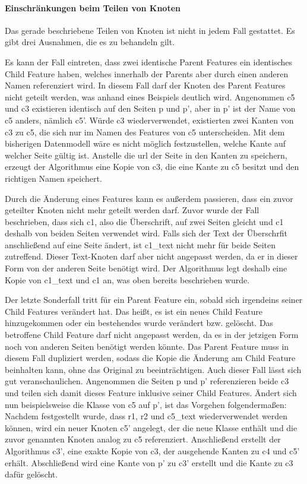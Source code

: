     \paragraph{Einschränkungen beim Teilen von Knoten}
    Das gerade beschriebene Teilen von Knoten ist nicht in jedem Fall gestattet.
    Es gibt drei Ausnahmen, die es zu behandeln gilt.

    Es kann der Fall eintreten, dass zwei identische Parent Features
    ein identisches Child Feature haben,
    welches innerhalb der Parents aber durch einen anderen Namen referenziert wird.
    In diesem Fall darf der Knoten des Parent Features nicht geteilt werden,
    was anhand eines Beispiels deutlich wird.
    Angenommen c5 und c3 existieren identisch auf den Seiten p und p',
    aber in p' ist der Name von c5 anders, nämlich c5'.
    Würde c3 wiederverwendet, existierten zwei Kanten von c3 zu c5,
    die sich nur im Namen des Features von c5 unterscheiden.
    Mit dem bisherigen Datenmodell wäre es nicht möglich festzustellen,
    welche Kante auf welcher Seite gültig ist.
    Anstelle die \gls{url} der Seite in den Kanten zu speichern,
    erzeugt der Algorithmus eine Kopie von c3,
    die eine Kante zu c5 besitzt und den richtigen Namen speichert.

    Durch die Änderung eines Features kann es außerdem passieren,
    dass ein zuvor geteilter Knoten nicht mehr geteilt werden darf.
    Zuvor wurde der Fall beschrieben, dass sich c1,
    also die Überschrift, auf zwei Seiten gleicht und c1 deshalb von beiden Seiten
    verwendet wird.
    Falls sich der Text der Überschrfit anschließend auf eine Seite ändert,
    ist c1\_text nicht mehr für beide Seiten zutreffend.
    Dieser Text-Knoten darf aber nicht angepasst werden,
    da er in dieser Form von der anderen Seite benötigt wird.
    Der Algorithmus legt deshalb eine Kopie von c1\_text und c1 an,
    was oben bereits beschrieben wurde.

    Der letzte Sonderfall tritt für ein Parent Feature ein,
    sobald sich irgendeins seiner Child Features verändert hat.
    Das heißt, es ist ein neues Child Feature hinzugekommen oder
    ein bestehendes wurde verändert bzw. gelöscht.
    Das betroffene Child Feature darf nicht angepasst werden,
    da es in der jetzigen Form noch von anderen Seiten benötigt werden könnte.
    Das Parent Feature muss in diesem Fall dupliziert werden,
    sodass die Kopie die Änderung am Child Feature beinhalten kann,
    ohne das Original zu beeinträchtigen.
    Auch dieser Fall lässt sich gut veranschaulichen.
    Angenommen die Seiten p und p' referenzieren beide c3 und teilen sich damit
    dieses Feature inklusive seiner Child Features.
    Ändert sich nun beispielsweise die Klasse von c5 auf p',
    ist das Vorgehen folgendermaßen:
    Nachdem festgestellt wurde, dass r1, r2 und c5\_text wiederverwendet werden können,
    wird ein neuer Knoten c5' angelegt, der die neue Klasse enthält
    und die zuvor genannten Knoten analog zu c5 referenziert.
    Anschließend erstellt der Algorithmus c3', eine exakte Kopie von c3,
    der ausgehende Kanten zu c4 und c5' erhält.
    Abschließend wird eine Kante von p' zu c3' erstellt und die Kante zu c3 dafür gelöscht.

